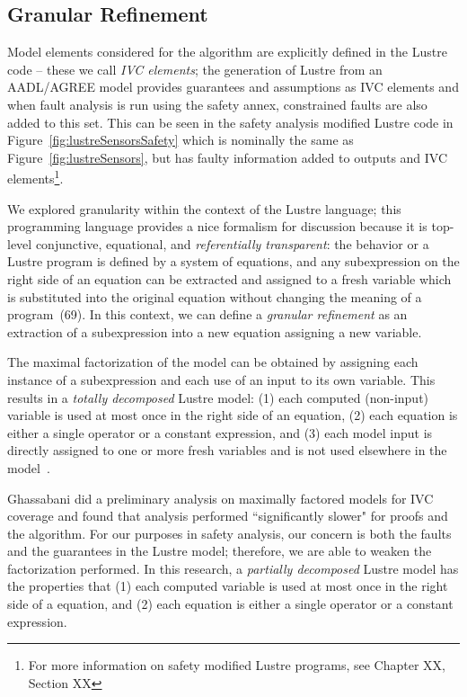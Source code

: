 \subsection{Granular Refinement}
Model elements considered for the \aivcalg algorithm are explicitly defined in the Lustre code -- these we call \emph{IVC elements}; the generation of Lustre from an AADL/AGREE model provides guarantees and assumptions as IVC elements and when fault analysis is run using the safety annex, constrained faults are also added to this set. This can be seen in the safety analysis modified Lustre code in Figure~\ref{fig:lustreSensorsSafety} which is nominally the same as Figure~\ref{fig:lustreSensors}, but has faulty information added to outputs and IVC elements\footnote{For more information on safety modified Lustre programs, see Chapter XX, Section XX }. 


 We explored granularity within the context of the Lustre language; this programming language provides a nice formalism for discussion because it is top-level conjunctive, equational, and \emph{referentially transparent}: the behavior or a Lustre program is defined by a system of equations, and any subexpression on the right side of an equation can be extracted and assigned to a fresh variable which is substituted into the original equation without changing the meaning of a program~\cite{}(69). In this context, we can define a \emph{granular refinement} as an extraction of a subexpression into a new equation assigning a new variable. 

The maximal factorization of the model can be obtained by assigning each instance of a subexpression and each use of an input to its own variable. This results in a \emph{totally decomposed} Lustre model: (1) each computed (non-input) variable is used at most once in the right side of an equation, (2) each equation is either a single operator or a constant expression, and (3) each model input is directly assigned to one or more fresh variables and is not used elsewhere in the model~\cite{ghassabani_2018}.

Ghassabani did a preliminary analysis on maximally factored models for IVC coverage and found that analysis performed ``significantly slower" for proofs and the \ivcmust algorithm. For our purposes in safety analysis, our concern is both the faults and the guarantees in the Lustre model; therefore, we are able to weaken the factorization performed. In this research, a \emph{partially decomposed} Lustre model has the properties that (1) each computed variable is used at most once in the right side of a equation, and (2) each equation is either a single operator or a constant expression. 

